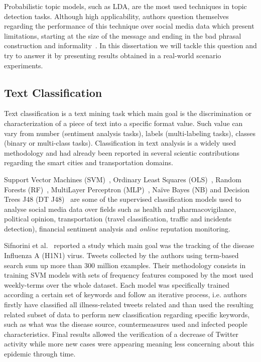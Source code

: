 Probabilistic topic models, such as \gls{LDA}, are the most used techniques in topic detection tasks. Although high applicability, authors question themselves regarding the performance of this technique over social media data which present limitations, starting at the size of the message and ending in the bad phrasal construction and informality~\cite{kn:Mehrotra2013}. In this dissertation we will tackle this question and try to answer it by presenting results obtained in a real-world scenario experiments.

\subsection{Text Classification}

Text classification is a text mining task which main goal is the discrimination or characterization of a piece of text into a specific format value. Such value can vary from number (sentiment analysis tasks), labels (multi-labeling tasks), classes (binary or multi-class tasks). Classification in text analysis is a widely used methodology and had already been reported in several scientic contributions regarding the smart cities and transportation domains.

Support Vector Machines (SVM)~\cite{signorini2011use, zhang2016mining, pereira2017transportation, carvalho2010real}, Ordinary Least Squares (OLS)~\cite{saleiro2016sentiment}, Random Forests (RF)~\cite{saleiro2017feup}, MultiLayer Perceptron (MLP)~\cite{saleiro2017texrep}, Naïve Bayes (NB) and Decision Trees J48 (DT J48)~\cite{kuflik2017automating} are some of the supervised classification models used to analyse social media data over fields such as health and pharmacovigilance, political opinion, transportation (travel classification, traffic and incidents detection), financial sentiment analysis and \textit{online} reputation monitoring.

Sifnorini et al.~\cite{signorini2011use} reported a study which main goal was the tracking of the disease Influenza A (H1N1) virus. Tweets collected by the authors using term-based search sum up more than 300 million examples. Their methodology consists in training SVM models with sets of frequency features composed by the most used weekly-terms over the whole dataset. Each model was specifically trained according a certain set of keywords and follow an iterative process, i.e. authors firstly have classified all illness-related tweets related and than used the resulting related subset of data to perform new classification regarding specific keywords, such as what was the disease source, countermeasures used and infected people characteristics. Final results allowed the verification of a decrease of Twitter activity while more new cases were appearing meaning less concerning about this epidemic through time.

